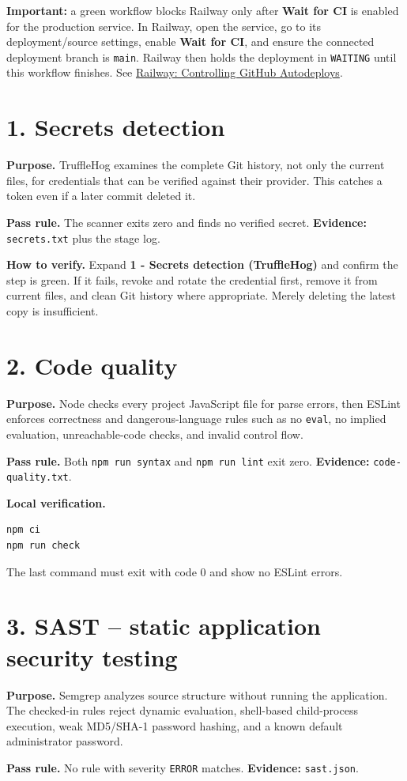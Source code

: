 \documentclass[11pt,a4paper]{article}
\newcommand{\stage}[2]{\section{#1. #2}}
\newcommand{\evidence}[1]{\textbf{Evidence:} \texttt{#1}}
\begin{document}
\textbf{Important:} a green workflow blocks Railway only after \textbf{Wait for CI} is enabled for the production service. In Railway, open the service, go to its deployment/source settings, enable \textbf{Wait for CI}, and ensure the connected deployment branch is \texttt{main}. Railway then holds the deployment in \texttt{WAITING} until this workflow finishes. See \href{https://docs.railway.com/deployments/github-autodeploys}{Railway: Controlling GitHub Autodeploys}.

\stage{1}{Secrets detection}

\textbf{Purpose.} TruffleHog examines the complete Git history, not only the current files, for credentials that can be verified against their provider. This catches a token even if a later commit deleted it.

\textbf{Pass rule.} The scanner exits zero and finds no verified secret. \evidence{secrets.txt} plus the stage log.

\textbf{How to verify.} Expand \textbf{1 - Secrets detection (TruffleHog)} and confirm the step is green. If it fails, revoke and rotate the credential first, remove it from current files, and clean Git history where appropriate. Merely deleting the latest copy is insufficient.

\stage{2}{Code quality}

\textbf{Purpose.} Node checks every project JavaScript file for parse errors, then ESLint enforces correctness and dangerous-language rules such as no \texttt{eval}, no implied evaluation, unreachable-code checks, and invalid control flow.

\textbf{Pass rule.} Both \texttt{npm run syntax} and \texttt{npm run lint} exit zero. \evidence{code-quality.txt}.

\textbf{Local verification.}
\begin{lstlisting}
npm ci
npm run check
\end{lstlisting}
The last command must exit with code 0 and show no ESLint errors.

\stage{3}{SAST -- static application security testing}

\textbf{Purpose.} Semgrep analyzes source structure without running the application. The checked-in rules reject dynamic evaluation, shell-based child-process execution, weak MD5/SHA-1 password hashing, and a known default administrator password.

\textbf{Pass rule.} No rule with severity \texttt{ERROR} matches. \evidence{sast.json}.
\end{document}
